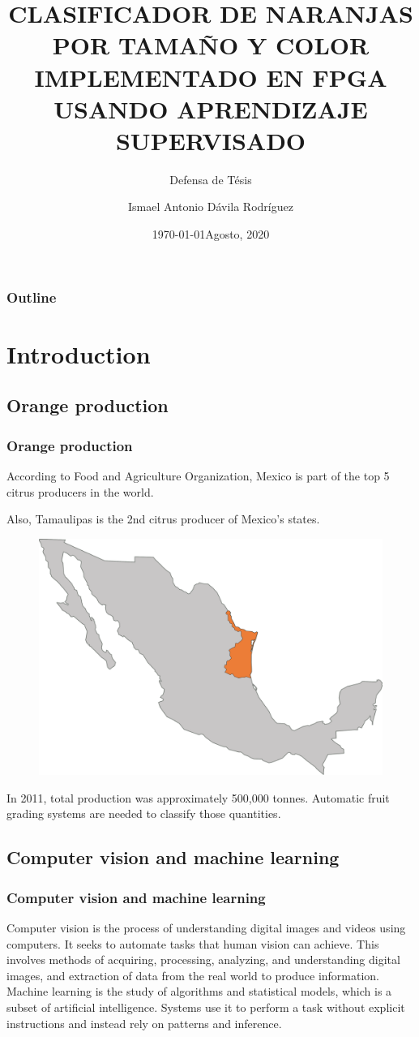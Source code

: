 \documentclass[
serif,
compress,
xcolor=table,
dvipsnames,
]{beamer}
\date{\specialdate\today}
\title[CLASIFICADOR DE NARANJAS POR TAMAÑO Y COLOR
IMPLEMENTADO EN FPGA USANDO APRENDIZAJE
SUPERVISADO]{CLASIFICADOR DE NARANJAS POR TAMAÑO Y COLOR
	IMPLEMENTADO EN FPGA USANDO APRENDIZAJE
	SUPERVISADO}
\subtitle[short]{Defensa de Tésis}
\author[Ismael Antonio Dávila Rodríguez]{Ismael Antonio Dávila Rodríguez}
\institute[UPV]{Universidad Politécnica de Victoria}
\date[]{Agosto, 2020}
\begin{document}
\begin{frame}[plain]
  \titlepage
\end{frame}

\begin{frame}
\frametitle{Outline}
  \tableofcontents
\end{frame}




\section{Introduction}

\subsection{Orange production}
\begin{frame}
\frametitle{Orange production}

According to Food and Agriculture Organization, Mexico is part of the top 5 citrus producers in the world.

Also, Tamaulipas is the 2nd citrus producer of Mexico's states.

\begin{figure}[h]
    \centering
    \includegraphics[width=.5\linewidth]{map}
    \label{trans}
\end{figure}

In 2011, total production was approximately 500,000 tonnes. Automatic fruit grading systems are needed to classify those quantities.

\end{frame}

\subsection{Computer vision and machine learning}
\begin{frame}
\frametitle{Computer vision and machine learning}
Computer vision is the process of understanding digital images and videos using computers. It seeks to automate tasks that human vision can achieve. This involves methods of acquiring, processing, analyzing, and understanding digital images, and extraction of data from the real world to produce information.\\

Machine learning is the study of algorithms and statistical models, which is a subset of artificial intelligence. Systems use it to perform a task without explicit instructions and instead rely on patterns and inference.

\end{frame}
\end{document}
